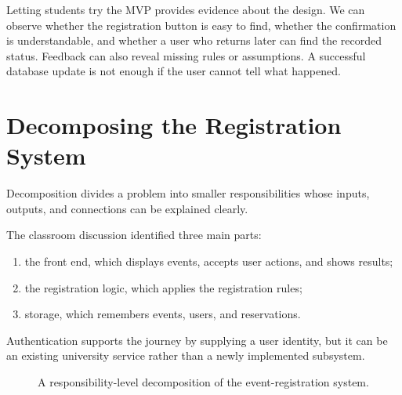 \documentclass[11pt]{article}
\begin{document}
Letting students try the MVP provides evidence about the design. We can observe whether the registration button is easy to find, whether the confirmation is understandable, and whether a user who returns later can find the recorded status. Feedback can also reveal missing rules or assumptions. A successful database update is not enough if the user cannot tell what happened.

\section{Decomposing the Registration System}

\begin{definition}[Decomposition]
Decomposition divides a problem into smaller responsibilities whose inputs, outputs, and connections can be explained clearly.
\end{definition}

The classroom discussion identified three main parts:
\begin{enumerate}
  \item the front end, which displays events, accepts user actions, and shows results;
  \item the registration logic, which applies the registration rules;
  \item storage, which remembers events, users, and reservations.
\end{enumerate}

Authentication supports the journey by supplying a user identity, but it can be an existing university service rather than a newly implemented subsystem.

\begin{figure}[htbp]
  \centering
  \caption{A responsibility-level decomposition of the event-registration system.}
  \label{fig:registration-decomposition}
\end{figure}
\end{document}
